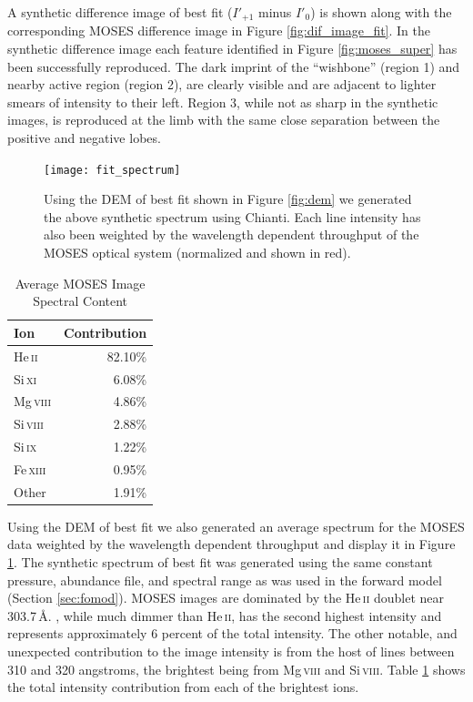 	A synthetic difference image of best fit ($I'_{+1}$ minus $I'_0$) is shown along with the corresponding MOSES difference image in Figure \ref{fig:dif_image_fit}.
	In the synthetic difference image each feature identified in Figure \ref{fig:moses_super} has been successfully reproduced.
	The dark imprint of the ``wishbone'' (region 1) and nearby active region (region 2), are clearly visible and are adjacent to lighter smears of intensity to their left.
	Region 3, while not as sharp in the synthetic images, is reproduced at the limb with the same close separation between the positive and negative lobes.
	
	\begin{figure}
		\centering
		\texttt{[image: fit\_spectrum]}
		\caption{Using the DEM of best fit shown in Figure \ref{fig:dem} we generated the above synthetic spectrum using Chianti. Each line intensity has also been weighted by the wavelength dependent throughput of the MOSES optical system (normalized and shown in red).}
		\label{fig:spectrum}
	\end{figure}
	\begin{table}
		\begin{center}
			\caption{Average MOSES Image Spectral Content}
			\label{table:spectral_content}
			\begin{tabular}{l|r}
				\hline
				Ion & Contribution \\
				\hline
				He\,\textsc{ii} & 82.10\% \\
				Si\,\textsc{xi} & 6.08\% \\
				Mg\,\textsc{viii} & 4.86\% \\
				Si\,\textsc{viii} & 2.88\% \\
				Si\,\textsc{ix} & 1.22\% \\
				Fe\,\textsc{xiii} & 0.95\% \\
				Other & 1.91\% \\ 
				\hline
			\end{tabular}
		\end{center}
	\end{table} 
	
	
	Using the DEM of best fit we also generated an average spectrum for the MOSES data weighted by the wavelength dependent throughput and display it in Figure \ref{fig:spectrum}.
	The synthetic spectrum of best fit was generated using the same constant pressure, abundance file, and spectral range as was used in the forward model (Section \ref{sec:fomod}).
	MOSES images are dominated by the He\,\textsc{ii} doublet near 303.7\,\AA.
	\sixi, while much dimmer than He\,\textsc{ii}, has the second highest intensity and represents approximately 6 percent of the total intensity.
	The other notable, and unexpected contribution to the image intensity is from the host of lines between 310 and 320 angstroms, the brightest being from Mg\,\textsc{viii} and Si\,\textsc{viii}.
	Table \ref{table:spectral_content} shows the total intensity contribution from each of the brightest ions.  
	

